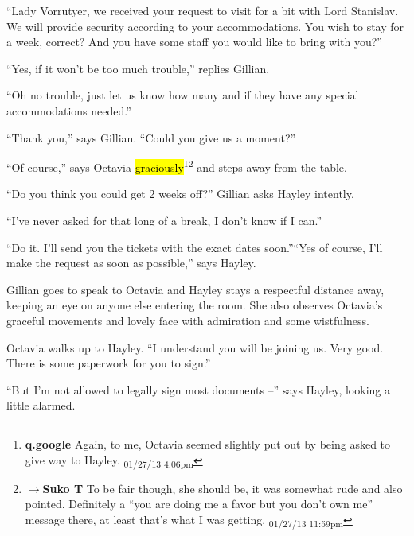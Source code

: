 ``Lady Vorrutyer, we received your request to visit for a bit with Lord Stanislav.  We will provide security according to your accommodations.  You wish to stay for a week, correct?  And you have some staff you would like to bring with you?''

``Yes, if it won't be too much trouble,'' replies Gillian.

``Oh no trouble, just let us know how many and if they have any special accommodations needed.''

``Thank you,'' says Gillian.  ``Could you give us a moment?''

``Of course,'' says Octavia \hl{graciously}\footnote{\textbf{q.google }Again, to me, Octavia seemed slightly put out by being asked to give way to Hayley. \textsubscript{01/27/13 4:06pm}}\footnote{$\rightarrow$\textbf{Suko T }To be fair though, she should be, it was somewhat rude and also pointed.  Definitely a ``you are doing me a favor but you don't own me'' message there, at least that's what I was getting. \textsubscript{01/27/13 11:59pm}} and steps away from the table.



``Do you think you could get 2 weeks off?'' Gillian asks Hayley intently.

``I've never asked for that long of a break, I don't know if I can.''

``Do it.  I'll send you the tickets with the exact dates soon.''``Yes of course, I'll make the request as soon as possible,'' says Hayley.



Gillian goes to speak to Octavia and Hayley stays a respectful distance away, keeping an eye on anyone else entering the room.  She also observes Octavia's graceful movements and lovely face with admiration and some wistfulness.



Octavia walks up to Hayley. ``I understand you will be joining us.  Very good.  There is some paperwork for you to sign.''

``But I'm not allowed to legally sign most documents --'' says Hayley, looking a little alarmed.

